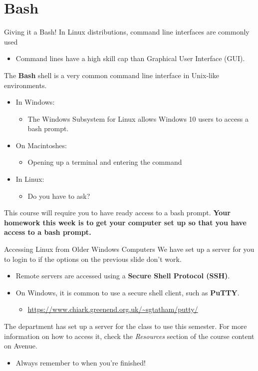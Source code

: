 \documentclass[11pt]{beamer}
\let\OldTexttt\texttt
\renewcommand{\texttt}[1]{\OldTexttt{\color{teal}{#1}}}
\begin{document}
\section[Using a Command Line]{Bash}
\begin{frame}{Giving it a Bash!}
In Linux distributions, command line interfaces are commonly used
\begin{itemize}
\item Command lines have a high skill cap than Graphical User Interface (GUI).  
\end{itemize}
The \textbf{Bash} shell is a very common command line interface in Unix-like environments.
\begin{itemize}
\item In Windows:
	\begin{itemize}
	\item The Windows Subsystem for Linux allows Windows 10 users to access a bash prompt. 
	\end{itemize}
\item On Macintoshes:
	\begin{itemize}
	\item Opening up a terminal and entering the command \texttt{bash}
	\end{itemize}
\item In Linux:
	\begin{itemize}
	\item Do you have to ask? 
	\end{itemize}
\end{itemize}
This course will require you to have ready access to a bash prompt.  \textbf{Your homework this week is to get your computer set up so that you have access to a bash prompt.}  
\end{frame}

\begin{frame}{Accessing Linux from Older Windows Computers}
We have set up a server for you to login to if the options on the previous slide don't work.  
\begin{itemize}
\item Remote servers are accessed using a \textbf{Secure Shell Protocol (SSH)}.  
\item On Windows, it is common to use a secure shell client, such as \textbf{PuTTY}.
\begin{itemize}
\item \url{https://www.chiark.greenend.org.uk/~sgtatham/putty/}
\end{itemize}
\end{itemize}
The department has set up a server for the class to use this semester.  For more information on how to access it, check the \emph{Resources} section of the course content on Avenue.
\begin{itemize}
\item Always remember to \texttt{logout} when you're finished! 
\end{itemize}
\end{frame}
\end{document}
